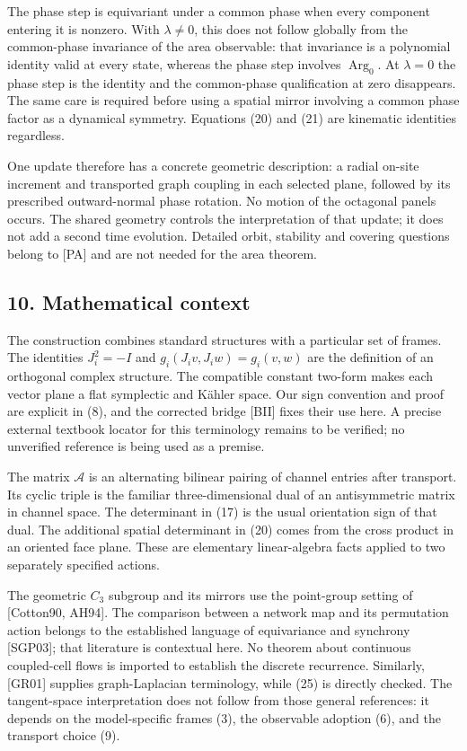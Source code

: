 \documentclass[
  11pt,
  a4paper,
]{article}
\begin{document}
The phase step is equivariant under a common phase when every component entering it is nonzero. With \(\lambda\ne0\), this does not follow globally from the common-phase invariance of the area observable: that invariance is a polynomial identity valid at every state, whereas the phase step involves \(\operatorname{Arg}_0\). At \(\lambda=0\) the phase step is the identity and the common-phase qualification at zero disappears. The same care is required before using a spatial mirror involving a common phase factor as a dynamical symmetry. Equations (20) and (21) are kinematic identities regardless.

One update therefore has a concrete geometric description: a radial on-site increment and transported graph coupling in each selected plane, followed by its prescribed outward-normal phase rotation. No motion of the octagonal panels occurs. The shared geometry controls the interpretation of that update; it does not add a second time evolution. Detailed orbit, stability and covering questions belong to {[}PA{]} and are not needed for the area theorem.

\subsection{10. Mathematical context}\label{mathematical-context}

The construction combines standard structures with a particular set of frames. The identities \(J_i^2=-I\) and \(g_i(J_iv,J_iw)=g_i(v,w)\) are the definition of an orthogonal complex structure. The compatible constant two-form makes each vector plane a flat symplectic and Kähler space. Our sign convention and proof are explicit in (8), and the corrected bridge {[}BII{]} fixes their use here. A precise external textbook locator for this terminology remains to be verified; no unverified reference is being used as a premise.

The matrix \(\mathcal A\) is an alternating bilinear pairing of channel entries after transport. Its cyclic triple is the familiar three-dimensional dual of an antisymmetric matrix in channel space. The determinant in (17) is the usual orientation sign of that dual. The additional spatial determinant in (20) comes from the cross product in an oriented face plane. These are elementary linear-algebra facts applied to two separately specified actions.

The geometric \(C_3\) subgroup and its mirrors use the point-group setting of {[}Cotton90, AH94{]}. The comparison between a network map and its permutation action belongs to the established language of equivariance and synchrony {[}SGP03{]}; that literature is contextual here. No theorem about continuous coupled-cell flows is imported to establish the discrete recurrence. Similarly, {[}GR01{]} supplies graph-Laplacian terminology, while (25) is directly checked. The tangent-space interpretation does not follow from those general references: it depends on the model-specific frames (3), the observable adoption (6), and the transport choice (9).
\end{document}
